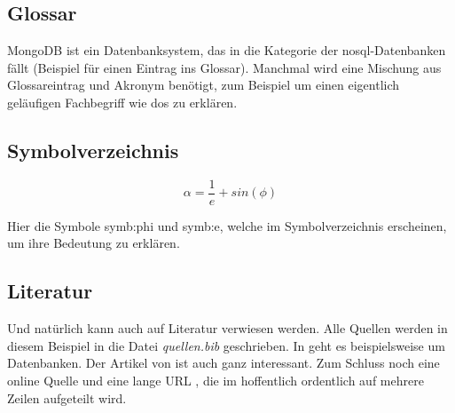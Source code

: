 \subsection{Glossar}

MongoDB ist ein Datenbanksystem, das in die Kategorie der \gls{nosql}-Datenbanken fällt (Beispiel für einen Eintrag ins Glossar).
Manchmal wird eine Mischung aus Glossareintrag und Akronym benötigt, zum Beispiel um einen eigentlich geläufigen Fachbegriff wie \gls{dos} zu erklären.

\subsection{Symbolverzeichnis}

\begin{equation}
  \alpha = \frac{1}{e} + sin(\phi)
\end{equation}

Hier die Symbole \gls{symb:phi} und \gls{symb:e}, welche im Symbolverzeichnis erscheinen, um ihre Bedeutung zu erklären.

\subsection{Literatur}

Und natürlich kann auch auf Literatur verwiesen werden.
Alle Quellen werden in diesem Beispiel in die Datei \textit{quellen.bib} geschrieben.
In  \cite{unterstein12} geht es beispielsweise um Datenbanken.
Der Artikel von \citeauthor{goldberg91} \cite{goldberg91} ist auch ganz interessant.
Zum Schluss noch eine online Quelle \cite{wave} und eine lange URL \cite{long}, die im  hoffentlich ordentlich auf mehrere Zeilen aufgeteilt wird.
